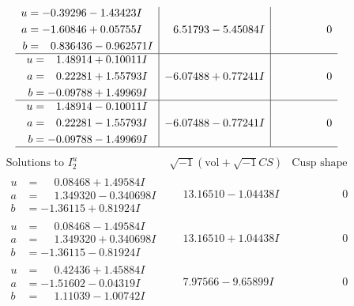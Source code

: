 \documentclass[1p]{elsarticle_modified}
\theoremstyle{definition}
\newcommand{\I}{\sqrt{-1}}
\begin{document}
$$\begin{array}{c|c|c}
\begin{aligned}
u &= -0.39296 - 1.43423 I \\
a &= -1.60846 + 0.05755 I \\
b &= \phantom{-}0.836436 - 0.962571 I\end{aligned}
 & \phantom{-}6.51793 - 5.45084 I & \phantom{-0.000000 } 0 \\ \hline\begin{aligned}
u &= \phantom{-}1.48914 + 0.10011 I \\
a &= \phantom{-}0.22281 + 1.55793 I \\
b &= -0.09788 + 1.49969 I\end{aligned}
 & -6.07488 + 0.77241 I & \phantom{-0.000000 } 0 \\ \hline\begin{aligned}
u &= \phantom{-}1.48914 - 0.10011 I \\
a &= \phantom{-}0.22281 - 1.55793 I \\
b &= -0.09788 - 1.49969 I\end{aligned}
 & -6.07488 - 0.77241 I & \phantom{-0.000000 } 0\\
 \hline 
 \end{array}$$\newpage$$\begin{array}{c|c|c}  
\text{Solutions to }I^u_{2}& \I (\text{vol} + \sqrt{-1}CS) & \text{Cusp shape}\\
 \hline 
\begin{aligned}
u &= \phantom{-}0.08468 + 1.49584 I \\
a &= \phantom{-}1.349320 - 0.340698 I \\
b &= -1.36115 + 0.81924 I\end{aligned}
 & \phantom{-}13.16510 - 1.04438 I & \phantom{-0.000000 } 0 \\ \hline\begin{aligned}
u &= \phantom{-}0.08468 - 1.49584 I \\
a &= \phantom{-}1.349320 + 0.340698 I \\
b &= -1.36115 - 0.81924 I\end{aligned}
 & \phantom{-}13.16510 + 1.04438 I & \phantom{-0.000000 } 0 \\ \hline\begin{aligned}
u &= \phantom{-}0.42436 + 1.45884 I \\
a &= -1.51602 - 0.04319 I \\
b &= \phantom{-}1.11039 - 1.00742 I\end{aligned}
 & \phantom{-}7.97566 - 9.65899 I & \phantom{-0.000000 } 0 \\ \hline\begin{aligned}

\end{aligned}
\end{array}$$
\end{document}
